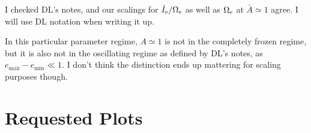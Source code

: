 \documentclass[11pt,
        usenames, %
        dvipsnames %
    ]{article}
\begin{document}
\def\Snospace~{\S{}} %
\renewcommand*{\sectionautorefname}{\Snospace}
\renewcommand*{\appendixautorefname}{\Snospace}
\renewcommand*{\figureautorefname}{Fig.}
\renewcommand*{\equationautorefname}{Eq.}
\renewcommand*{\tableautorefname}{Tab.}

I checked DL's notes, and our scalings for $\dot{I}_{\rm e} / \Omega_{\rm e}$ as
well as $\Omega_{\rm e}$ at $\bar{A} \simeq 1$ agree. I will use DL notation
when writing it up.

In this particular parameter regime, $A \simeq 1$ is not in the completely
frozen regime, but it is also not in the oscillating regime as defined by DL's
notes, as $e_{\max} - e_{\min} \ll 1$. I don't think the distinction ends up
mattering for scaling purposes though.

\section{Requested Plots}
\end{document}
